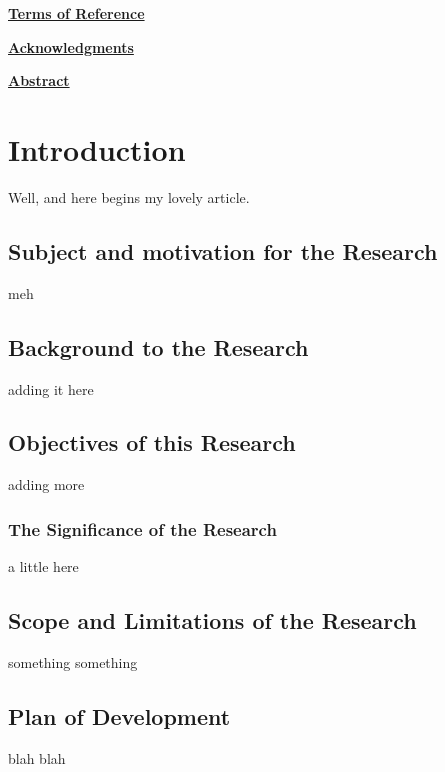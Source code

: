 \documentclass[a4paper,11pt]{article}
\begin{document}
	\mbox{}
	\thispagestyle{empty}
	\newpage	
	
	
	{\centering\Huge\bfseries\underline{Terms of Reference}\par}
	\newpage
	
	{\centering\Huge\bfseries\underline{Acknowledgments}\par}
	\newpage
	
	\mbox{}
	\newpage
	
	{\centering\Huge\bfseries\underline{Abstract}\par}
	\newpage	
	
	\tableofcontents
	\newpage
		
	\listoffigures
	\newpage
 
	\listoftables
	\newpage
	
	\newpage
	\newpage
	
\section{Introduction}
	Well, and here begins my lovely article.
	\subsection{Subject and motivation for the Research}
		meh
	\subsection{Background to the Research}
		adding it here
	\subsection{ Objectives of this Research}
		adding more
		\subsubsection{The Significance of the Research}
			a little here
	\subsection{Scope and Limitations of the Research}
		something something	
	\subsection{Plan of Development}	
		blah blah
	\newpage
\end{document}
